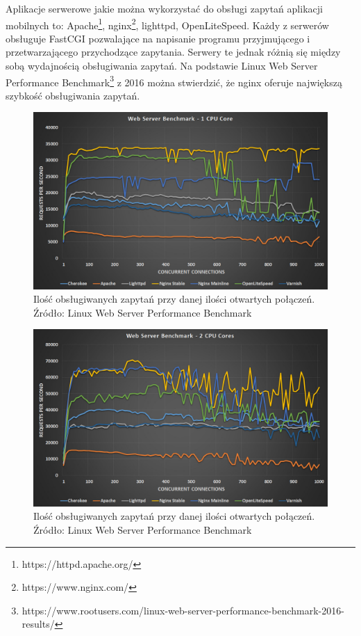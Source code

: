 \documentclass{report}
\begin{document}
	Aplikacje serwerowe jakie można wykorzystać do obsługi zapytań aplikacji mobilnych to: Apache\footnote{https://httpd.apache.org/}, nginx\footnote{https://www.nginx.com/}, lighttpd, OpenLiteSpeed. Każdy z serwerów obsługuje FastCGI pozwalające na napisanie programu przyjmującego i przetwarzającego przychodzące zapytania. Serwery te jednak różnią się między sobą wydajnością obsługiwania zapytań. Na podstawie Linux Web Server Performance Benchmark\footnote{https://www.rootusers.com/linux-web-server-performance-benchmark-2016-results/} z 2016 można stwierdzić, że nginx oferuje największą szybkość obsługiwania zapytań.
	
	\begin{center}
		\begin{figure}[ht]
			\centering
			\includegraphics[scale=0.3]{web-server-performance-benchmark-1-cpu-core-1.jpg}
			\caption{Ilość obsługiwanych zapytań przy danej ilości otwartych połączeń. Źródło: Linux Web Server Performance Benchmark}
		\end{figure}
	\end{center}

	\begin{center}
		\begin{figure}[ht]
			\centering
			\includegraphics[scale=0.3]{web-server-performance-benchmark-2-cpu-cores-2.jpg}
			\caption{Ilość obsługiwanych zapytań przy danej ilości otwartych połączeń. Źródło: Linux Web Server Performance Benchmark}
		\end{figure}
	\end{center}
	
\end{document}
